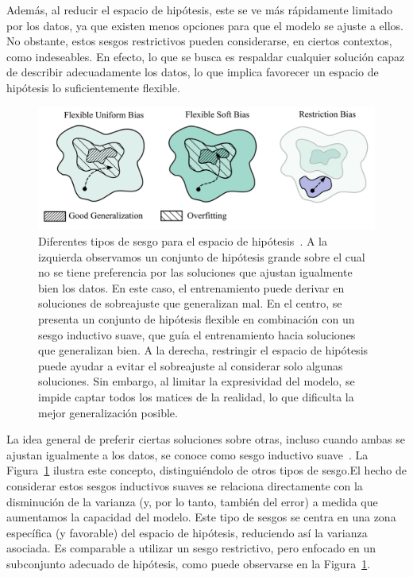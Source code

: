 Además, al reducir el espacio de hipótesis, este se ve más rápidamente limitado por los datos, ya que existen menos opciones para que el modelo se ajuste a ellos. No obstante, estos sesgos restrictivos pueden considerarse, en ciertos contextos, como indeseables. En efecto, lo que se busca es respaldar cualquier solución capaz de describir adecuadamente los datos, lo que implica favorecer un espacio de hipótesis lo suficientemente flexible.\newline

\begin{figure}[h]
    \centering
    \includegraphics[width=0.6\linewidth]{img/types-of-bias.png}
    \caption[Diferentes tipos de sesgo para el espacio de hipótesis~\cite{Wilson2025}.]{Diferentes tipos de sesgo para el espacio de hipótesis~\cite{Wilson2025}. A la izquierda observamos un conjunto de hipótesis grande sobre el cual no se tiene preferencia por las soluciones que ajustan igualmente bien los datos. En este caso, el entrenamiento puede derivar en soluciones de sobreajuste que generalizan mal. En el centro, se presenta un conjunto de hipótesis flexible en combinación con un sesgo inductivo suave, que guía el entrenamiento hacia soluciones que generalizan bien. A la derecha, restringir el espacio de hipótesis puede ayudar a evitar el sobreajuste al considerar solo algunas soluciones. Sin embargo, al limitar la expresividad del modelo, se impide captar todos los matices de la realidad, lo que dificulta la mejor generalización posible.}\label{fig:types-of-bias}
\end{figure}

La idea general de preferir ciertas soluciones sobre otras, incluso cuando ambas se ajustan igualmente a los datos, se conoce como sesgo inductivo suave~\cite{Wilson2025}. La Figura~\ref{fig:types-of-bias} ilustra este concepto, distinguiéndolo de otros tipos de sesgo.El hecho de considerar estos sesgos inductivos suaves se relaciona directamente con la disminución de la varianza (y, por lo tanto, también del error) a medida que aumentamos la capacidad del modelo. Este tipo de sesgos se centra en una zona específica (y favorable) del espacio de hipótesis, reduciendo así la varianza asociada. Es comparable a utilizar un sesgo restrictivo, pero enfocado en un subconjunto adecuado de hipótesis, como puede observarse en la Figura~\ref{fig:types-of-bias}.\newline

